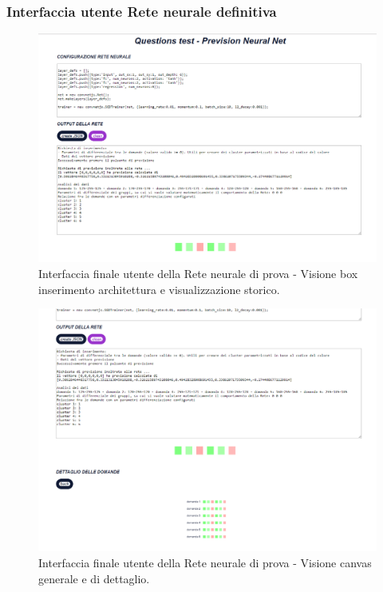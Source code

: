 \subsubsection{Interfaccia utente Rete neurale definitiva}
\label{Interfaccia utente Rete neurale}

\begin{figure}[H]
\centering
	\includegraphics[width=1\linewidth]{./image/Rete-di-prova_finale.png}
	\caption{Interfaccia finale utente della Rete neurale di prova - Visione box inserimento architettura e visualizzazione storico.}
	\label{Interfaccia finale utente della Rete neurale di prova -1.}
\end{figure}
\noindent

\begin{figure}[H]
\centering
	\includegraphics[width=1\linewidth]{./image/Rete-di-prova_finale2.png}
	\caption{Interfaccia finale utente della Rete neurale di prova - Visione canvas generale e di dettaglio.}
	\label{Interfaccia finale utente della Rete neurale di prova - 2.}
\end{figure}
\noindent

